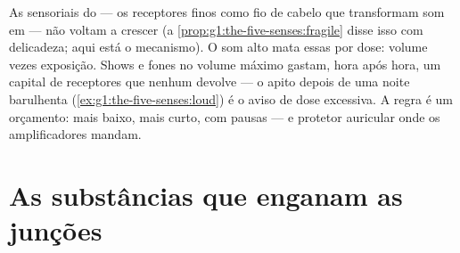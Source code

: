 \begin{proposition}\label{prop:g8:protecting-the-nervous-system:noise}
As  sensoriais do  --- os receptores finos como fio de
cabelo que transformam som em  --- não voltam a
crescer (a \cref{prop:g1:the-five-senses:fragile} disse isso com
delicadeza; aqui está o mecanismo). O som alto mata essas  por
dose: volume vezes exposição. Shows e fones no volume máximo gastam,
hora após hora, um capital de receptores que  nenhum devolve --- o
apito depois de uma noite barulhenta
(\cref{ex:g1:the-five-senses:loud}) é o aviso de dose excessiva. A
regra é um orçamento: mais baixo, mais curto, com pausas --- e protetor
auricular onde os amplificadores mandam.
\end{proposition}
\admitted

\section{As substâncias que enganam as junções}

